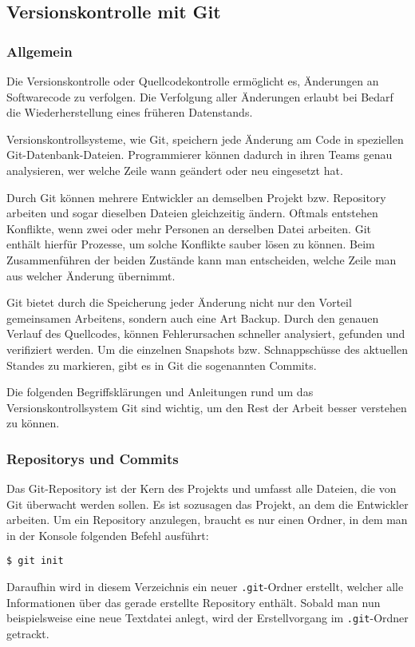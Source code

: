 \subsection{Versionskontrolle mit Git}
\subsubsection{Allgemein}
Die Versionskontrolle oder Quellcodekontrolle ermöglicht es, Änderungen an
Softwarecode zu verfolgen. Die Verfolgung aller Änderungen erlaubt bei Bedarf
die Wiederherstellung eines früheren Datenstands. \parencite{git-allgemein}

Versionskontrollsysteme, wie Git, speichern jede Änderung am Code in speziellen
Git-Datenbank-Dateien. Programmierer können dadurch in ihren Teams genau
analysieren, wer welche Zeile wann geändert oder neu eingesetzt hat.

Durch Git können mehrere Entwickler an demselben Projekt bzw. Repository
arbeiten und sogar dieselben Dateien gleichzeitig ändern. Oftmals entstehen
Konflikte, wenn zwei oder mehr Personen an derselben Datei arbeiten. Git enthält
hierfür Prozesse, um solche Konflikte sauber lösen zu können. Beim
Zusammenführen der beiden Zustände kann man entscheiden, welche Zeile man aus
welcher Änderung übernimmt.

Git bietet durch die Speicherung jeder Änderung nicht nur den Vorteil
gemeinsamen Arbeitens, sondern auch eine Art \glqq Backup\grqq{}. Durch den
genauen Verlauf des Quellcodes, können Fehlerursachen schneller analysiert,
gefunden und verifiziert werden. Um die einzelnen Snap\-shots bzw.
Schnappschüsse des aktuellen Standes zu markieren, gibt es in Git die
sogenannten Commits.

\newpage

Die folgenden Begriffsklärungen und Anleitungen rund um das
Versionskontrollsystem Git sind wichtig, um den Rest der Arbeit besser verstehen
zu können.

\subsubsection{Repositorys und Commits}
Das Git-Repository ist der Kern des Projekts und umfasst alle Dateien, die von
Git überwacht werden sollen. Es ist sozusagen das Projekt, an dem die Entwickler
arbeiten. Um ein Repository anzulegen, braucht es nur einen Ordner, in dem man
in der Konsole folgenden Befehl ausführt:
\begin{lstlisting}[style=Bash]
    $ git init
\end{lstlisting}
Daraufhin wird in diesem Verzeichnis ein neuer \texttt{.git}-Ordner erstellt,
welcher alle Informationen über das gerade erstellte Repository enthält. Sobald
man nun beispielsweise eine neue Textdatei anlegt, wird der Erstellvorgang im
\texttt{.git}-Ordner getrackt.

